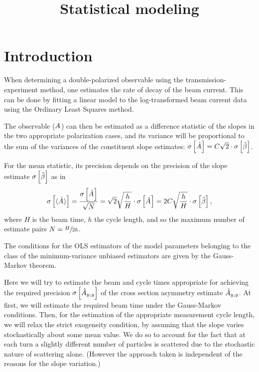 \documentclass{article}
\begin{document}
\title{Statistical modeling}
\maketitle

\section*{Introduction}
When determining a double-polarized observable using the transmission-experiment method, one estimates the rate of decay of the beam current. This can be done by fitting a linear model to the log-transformed beam current data using the Ordinary Least Squares method.

The observable ($\A$) can then be estimated as a difference statistic of the slopes in the two appropriate polarization cases, and its variance will be proportional to the sum of the variances of the constituent slope estimates: $\SE{\A*} = C\sqrt{2}\cdot\SE{\slp*}$.

For the mean statistic, its precision depends on the precision of the slope estimate $\SE{\slp*}$ as in
\begin{equation}\label{eq:AvgASE}
	\SE{\avg{\A*}} = \frac{\SE{\A*}}{\sqrt N} = \sqrt{2}\sqrt{\frac hH}\cdot\SE{\A*} = 2C\sqrt{\frac hH}\cdot\SE{\slp*},
\end{equation}
where $H$ is the beam time, $h$ the cycle length, and so the maximum number of estimate pairs $N = \sfrac{H}{2h}$.

The conditions for the OLS estimators of the model parameters belonging to the class of the minimum-variance unbiased estimators are given by the Gauss-Markov theorem. 

Here we will try to estimate the beam and cycle times appropriate for achieving the required precision $\SE{\Ayy*}$ of the cross section asymmetry estimate $\Ayy*$. At first, we will estimate the required beam time under the Gauss-Markov conditions. Then, for the estimation of the appropriate measurement cycle length, we will relax the strict exogeneity condition, by assuming that the slope varies stochastically about some mean value. We do so to account for the fact that at each turn a slightly different number of particles is scattered due to the stochastic nature of scattering alone. (However the approach taken is independent of the reasons for the slope variation.)
\end{document}
